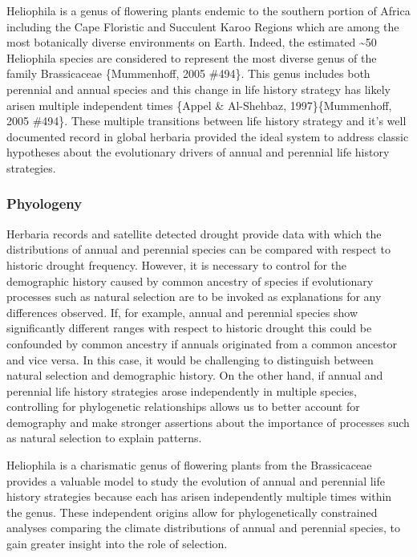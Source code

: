 \documentclass[man,floatsintext]{apa6}
\theoremstyle{definition}
\theoremstyle{definition}
\theoremstyle{definition}
\theoremstyle{remark}
\begin{document}
Heliophila is a genus of flowering plants endemic to the southern
portion of Africa including the Cape Floristic and Succulent Karoo
Regions which are among the most botanically diverse environments on
Earth. Indeed, the estimated \textasciitilde{}50 Heliophila species are
considered to represent the most diverse genus of the family
Brassicaceae \{Mummenhoff, 2005 \#494\}. This genus includes both
perennial and annual species and this change in life history strategy
has likely arisen multiple independent times \{Appel \& Al-Shehbaz,
1997\}\{Mummenhoff, 2005 \#494\}. These multiple transitions between
life history strategy and it's well documented record in global herbaria
provided the ideal system to address classic hypotheses about the
evolutionary drivers of annual and perennial life history strategies.

\hypertarget{phyologeny}{%
\subsubsection{Phyologeny}\label{phyologeny}}

Herbaria records and satellite detected drought provide data with which
the distributions of annual and perennial species can be compared with
respect to historic drought frequency. However, it is necessary to
control for the demographic history caused by common ancestry of species
if evolutionary processes such as natural selection are to be invoked as
explanations for any differences observed. If, for example, annual and
perennial species show significantly different ranges with respect to
historic drought this could be confounded by common ancestry if annuals
originated from a common ancestor and vice versa. In this case, it would
be challenging to distinguish between natural selection and demographic
history. On the other hand, if annual and perennial life history
strategies arose independently in multiple species, controlling for
phylogenetic relationships allows us to better account for demography
and make stronger assertions about the importance of processes such as
natural selection to explain patterns.

Heliophila is a charismatic genus of flowering plants from the
Brassicaceae provides a valuable model to study the evolution of annual
and perennial life history strategies because each has arisen
independently multiple times within the genus. These independent origins
allow for phylogenetically constrained analyses comparing the climate
distributions of annual and perennial species, to gain greater insight
into the role of selection.
\end{document}
